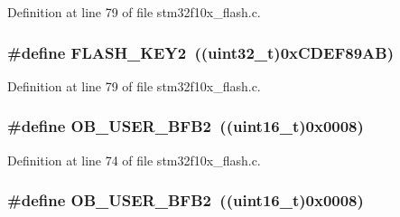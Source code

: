 Definition at line 79 of file stm32f10x\+\_\+flash.\+c.

\subsubsection[{\texorpdfstring{F\+L\+A\+S\+H\+\_\+\+K\+E\+Y2}{FLASH_KEY2}}]{\setlength{\rightskip}{0pt plus 5cm}\#define F\+L\+A\+S\+H\+\_\+\+K\+E\+Y2~(({\bf uint32\+\_\+t})0x\+C\+D\+E\+F89\+A\+B)}\hypertarget{group___f_l_a_s_h___private___defines_gaee83d0f557e158da52f4a205db6b60a7}{}\label{group___f_l_a_s_h___private___defines_gaee83d0f557e158da52f4a205db6b60a7}


Definition at line 79 of file stm32f10x\+\_\+flash.\+c.

\subsubsection[{\texorpdfstring{O\+B\+\_\+\+U\+S\+E\+R\+\_\+\+B\+F\+B2}{OB_USER_BFB2}}]{\setlength{\rightskip}{0pt plus 5cm}\#define O\+B\+\_\+\+U\+S\+E\+R\+\_\+\+B\+F\+B2~(({\bf uint16\+\_\+t})0x0008)}\hypertarget{group___f_l_a_s_h___private___defines_ga5098bd938dadebbbdf9e628c84b2dcf0}{}\label{group___f_l_a_s_h___private___defines_ga5098bd938dadebbbdf9e628c84b2dcf0}


Definition at line 74 of file stm32f10x\+\_\+flash.\+c.

\subsubsection[{\texorpdfstring{O\+B\+\_\+\+U\+S\+E\+R\+\_\+\+B\+F\+B2}{OB_USER_BFB2}}]{\setlength{\rightskip}{0pt plus 5cm}\#define O\+B\+\_\+\+U\+S\+E\+R\+\_\+\+B\+F\+B2~(({\bf uint16\+\_\+t})0x0008)}\hypertarget{group___f_l_a_s_h___private___defines_ga5098bd938dadebbbdf9e628c84b2dcf0}{}\label{group___f_l_a_s_h___private___defines_ga5098bd938dadebbbdf9e628c84b2dcf0}


